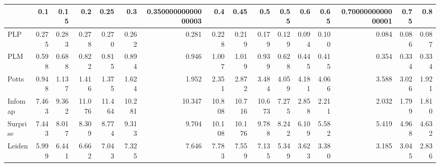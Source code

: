 \begin{tabular}{lrrrrrrrrrrrrrrr}
\toprule
{} &   0.1 &  0.15 &    0.2 &   0.25 &    0.3 & 0.35000000000000003 &    0.4 &   0.45 &    0.5 &  0.55 &   0.6 &  0.65 & 0.7000000000000001 &  0.75 &   0.8 \\
\midrule
PLP      & 0.275 & 0.283 &  0.278 &  0.270 &  0.262 &               0.281 &  0.228 &  0.219 &  0.179 & 0.129 & 0.094 & 0.100 &              0.084 & 0.086 & 0.087 \\
PLM      & 0.598 & 0.688 &  0.822 &  0.815 &  0.894 &               0.946 &  1.007 &  1.019 &  0.939 & 0.628 & 0.445 & 0.415 &              0.354 & 0.334 & 0.334 \\
Potts    & 0.948 & 1.137 &  1.416 &  1.375 &  1.624 &               1.952 &  2.351 &  2.872 &  3.484 & 4.059 & 4.181 & 4.066 &              3.588 & 3.026 & 1.921 \\
Infomap  & 7.463 & 9.362 & 11.076 & 11.464 & 10.281 &              10.347 & 10.808 & 10.716 & 10.673 & 7.275 & 2.858 & 2.211 &              2.032 & 1.799 & 1.810 \\
Surprise & 7.443 & 8.017 &  8.309 &  8.774 &  9.313 &               9.704 & 10.108 & 10.176 &  9.788 & 8.242 & 6.109 & 5.582 &              5.419 & 4.968 & 4.632 \\
Leiden   & 5.999 & 6.441 &  6.662 &  7.043 &  7.325 &               7.646 &  7.783 &  7.559 &  7.135 & 5.349 & 3.623 & 3.380 &              3.185 & 3.045 & 2.836 \\
\bottomrule
\end{tabular}
